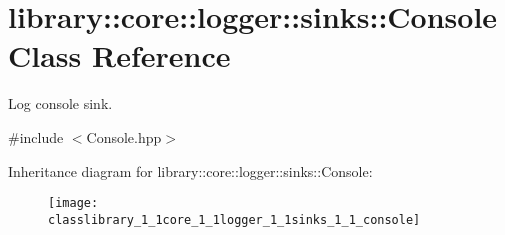 \hypertarget{classlibrary_1_1core_1_1logger_1_1sinks_1_1_console}{}\section{library\+:\+:core\+:\+:logger\+:\+:sinks\+:\+:Console Class Reference}
\label{classlibrary_1_1core_1_1logger_1_1sinks_1_1_console}


Log console sink.  




{\ttfamily \#include $<$Console.\+hpp$>$}

Inheritance diagram for library\+:\+:core\+:\+:logger\+:\+:sinks\+:\+:Console\+:\begin{figure}[H]
\begin{center}
\leavevmode
\texttt{[image: classlibrary\_1\_1core\_1\_1logger\_1\_1sinks\_1\_1\_console]}
\end{center}
\end{figure}

